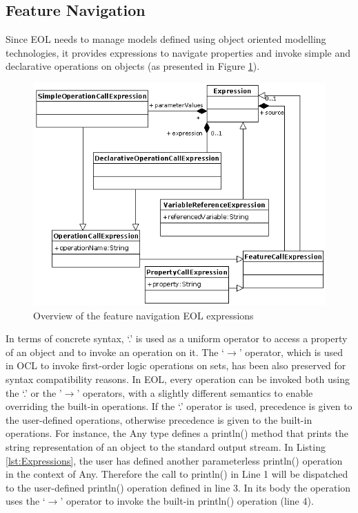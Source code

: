 \subsection{Feature Navigation}
\label{sec:Design.EOL.FeatureNavigation}
Since EOL needs to manage models defined using object oriented modelling technologies, it provides expressions to navigate properties and invoke simple and declarative operations on objects (as presented in Figure \ref{fig:EOLExpressions}). 

\begin{figure}
	\centering
		\includegraphics{images/EOLExpressions.png}
	\caption{Overview of the feature navigation EOL expressions}
	\label{fig:EOLExpressions}
\end{figure}

In terms of concrete syntax, `.' is used as a uniform operator to access a property of an object and to invoke an operation on it. The `$\rightarrow$' operator, which is used in OCL to invoke first-order logic operations on sets, has been also preserved for syntax compatibility reasons. In EOL, every operation can be invoked both using the `.' or the '$\rightarrow$' operators, with a slightly different semantics to enable overriding the built-in operations. If the `.' operator is used, precedence is given to the user-defined operations, otherwise precedence is given to the built-in operations. For instance, the Any type defines a println() method that prints the string representation of an object to the standard output stream. In Listing \ref{lst:Expressions}, the user has defined another parameterless println() operation in the context of Any. Therefore the call to println() in Line 1 will be dispatched to the user-defined println() operation defined in line 3. In its body the operation uses the `$\rightarrow$' operator to invoke the built-in println() operation (line 4).

